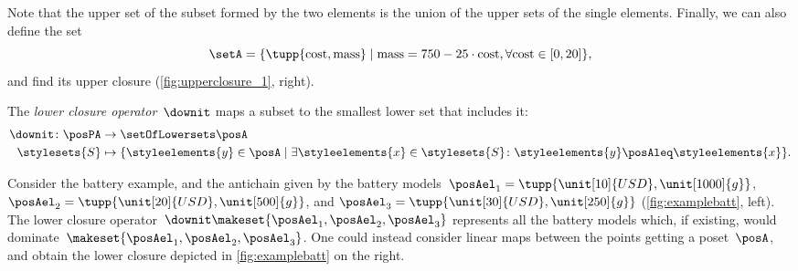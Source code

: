Note that the upper set of the subset formed by the two elements is the union of the upper sets of the single elements.
%
Finally, we can also define the set
%
\begin{equation}
    \setA=\{
    \tupp{\text{cost},\text{mass}}\mid \text{mass}=750-25\cdot \text{cost},
    \forall \text{cost} \in [0,20]
    \},
\end{equation}
%
and find its upper closure (\cref{fig:upperclosure_1}, right).
%
\begin{figure*}[h!]
    \centering
    \hfill
    \hfill
    \caption{Example of uppler closure for different sets of battery choices.}
    \label{fig:upperclosure_1}
\end{figure*}

\begin{definition}
    \label{def:lowerclosure}
    The \emph{lower closure operator}~$\downit$ maps a subset to the smallest lower set that includes it:
    \begin{equation*}
        \begin{aligned}
            \downit \colon \posPA & \to \setOfLowersets   \posA \\
            \stylesets{S}         & \mapsto \{ \styleelements{y}\in \posA \mid \exists \styleelements{x}\in \stylesets{S} \colon \styleelements{y}\posAleq \styleelements{x}\}.
        \end{aligned}
    \end{equation*}
\end{definition}

Consider the battery example, and the antichain given by the battery models~$\posAel_1=\tupp{\unit[10]{USD},\unit[1000]{g}}$, $\posAel_2=\tupp{\unit[20]{USD},\unit[500]{g}}$, and $\posAel_3=\tupp{\unit[30]{USD},\unit[250]{g}}$ (\cref{fig:examplebatt}, left).
The lower closure operator~$\downit\makeset{\posAel_1,\posAel_2,\posAel_3}$ represents all the battery models which, if existing, would dominate~$\makeset{\posAel_1,\posAel_2,\posAel_3}$.
One could instead consider linear maps between the points getting a poset~$\posA$, and obtain the lower closure depicted in \cref{fig:examplebatt} on the right.

\begin{figure*}[h!]
    \centering
    \hfill
    \hfill
    \caption{Example of lower closures.}
    \label{fig:examplebatt}
\end{figure*}

